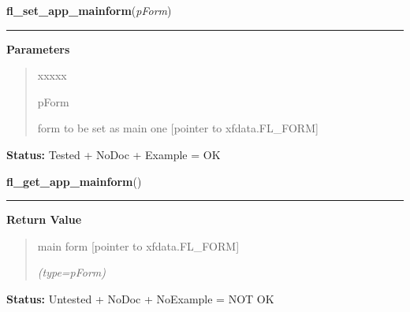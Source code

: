 \hspace{.8\funcindent}\begin{boxedminipage}{\funcwidth}

    \raggedright \textbf{fl\_set\_app\_mainform}(\textit{pForm})

    \vspace{-1.5ex}

    \rule{\textwidth}{0.5\fboxrule}
\setlength{\parskip}{2ex}
\setlength{\parskip}{1ex}
      \textbf{Parameters}
      \vspace{-1ex}

      \begin{quote}
        \begin{Ventry}{xxxxx}

          \item[pForm]

          form to be set as main one [pointer to xfdata.FL\_FORM]

        \end{Ventry}

      \end{quote}

\textbf{Status:} Tested + NoDoc + Example = OK



    \end{boxedminipage}

    \label{xformslib:library:fl_get_app_mainform}

    \vspace{0.5ex}

\hspace{.8\funcindent}\begin{boxedminipage}{\funcwidth}

    \raggedright \textbf{fl\_get\_app\_mainform}()

    \vspace{-1.5ex}

    \rule{\textwidth}{0.5\fboxrule}
\setlength{\parskip}{2ex}
\setlength{\parskip}{1ex}
      \textbf{Return Value}
    \vspace{-1ex}

      \begin{quote}
      main form [pointer to xfdata.FL\_FORM]

      {\it (type=pForm)}

      \end{quote}

\textbf{Status:} Untested + NoDoc + NoExample = NOT OK



    \end{boxedminipage}

